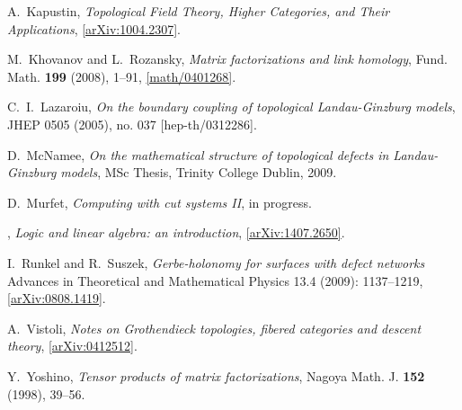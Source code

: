 \documentclass[english,letter paper,12pt,leqno]{article}
\theoremstyle{example}
\numberwithin{equation}{section}
\begin{document}
\begin{thebibliography}{BHLS03}
A.~Kapustin, \textsl{Topological {F}ield {T}heory, {H}igher {C}ategories, and
  {T}heir {A}pplications},
  \href{http://arxiv.org/abs/1004.2307}{[arXiv:1004.2307]}.
  
M.~Khovanov and L.~Rozansky, \textsl{Matrix factorizations and link homology}, Fund. Math.
  \textbf{199} (2008), 1--91,
  \href{http://arxiv.org/abs/math/0401268}{[math/0401268]}.
  
C.~I.~Lazaroiu, \textsl{On the boundary coupling of topological {L}andau-{G}inzburg models}, JHEP 0505 (2005), no. 037 [hep-th/0312286].
  
D.~McNamee, \textsl{On the mathematical structure of topological defects in
  {L}andau-{G}inzburg models}, MSc Thesis, Trinity College Dublin, 2009.
  
D.~Murfet, \textsl{Computing with cut systems II}, in progress.

\bysame, \textsl{Logic and linear algebra: an introduction}, \href{http://arxiv.org/abs/1407.2650}{[arXiv:1407.2650]}.


I.~Runkel and R.~Suszek, \textsl{Gerbe-holonomy for surfaces with defect networks} Advances in Theoretical and Mathematical Physics 13.4 (2009): 1137--1219, \href{http://arxiv.org/abs/0808.1419}{[arXiv:0808.1419]}.

A.~Vistoli, \textsl{Notes on {G}rothendieck topologies, fibered categories and descent theory}, \href{http://arxiv.org/abs/math/0412512}{[arXiv:0412512]}.

Y.~Yoshino, \textsl{Tensor products of matrix factorizations}, Nagoya Math. J.
  \textbf{152} (1998), 39--56.
  
\end{thebibliography}
\end{document}
